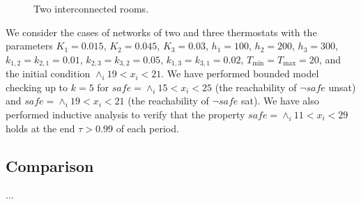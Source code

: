 \begin{figure}
\centering
{}
\caption{Two interconnected rooms. %
} \label{fig:adj-rooms}
\end{figure}

We consider the cases of networks of two and three thermostats
with the parameters
$K_1 = 0.015$, 
$K_2 = 0.045$, 
$K_3 = 0.03$, 
$h_1 = 100$,
$h_2 = 200$,
$h_3 = 300$,
$k_{1,2} = k_{2,1} = 0.01$,
$k_{2,3} = k_{3,2} = 0.05$,
$k_{1,3} = k_{3,1} = 0.02$,
$T_{\min} = T_{\max} = 20$,
and the initial condition $\wedge_{i} 19 < x_i < 21$.
We have performed bounded model checking up to $k = 5$
for $\mathit{safe} = \wedge_{i} 15 < x_i < 25$ 
(the reachability of $\neg\mathit{safe}$ unsat)
and $\mathit{safe} = \wedge_{i} 19 < x_i < 21$ 
(the reachability of $\neg\mathit{safe}$ sat).
We have also performed 
inductive analysis 
to verify that the property $\mathit{safe} = \wedge_{i} 11 < x_i < 29$
holds at the end $\tau > 0.99$ of each period.






\subsection{Comparison}

...

